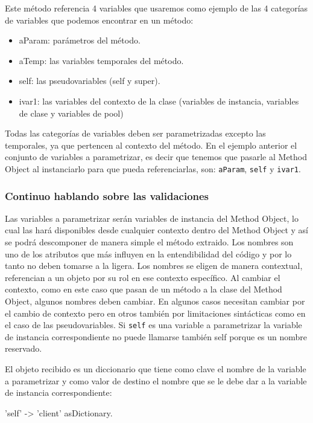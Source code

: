 Este método referencia 4 variables que usaremos como ejemplo de las 4 categorías
de variables que podemos encontrar en un método:

\begin{itemize}
    \item aParam: parámetros del método.
    \item aTemp: las variables temporales del método.
    \item self: las pseudovariables (self y super).
    \item ivar1: las variables del contexto de la clase (variables de instancia,
      variables de clase y variables de pool)
\end{itemize}

Todas las categorías de variables deben ser parametrizadas excepto las
temporales, ya que pertencen al contexto del método. En el ejemplo anterior el
conjunto de variables a parametrizar, es decir que tenemos que pasarle al Method
Object al instanciarlo para que pueda referenciarlas, son: \lstinline{aParam},
\lstinline{self} y \lstinline{ivar1}.

\subsubsection{Continuo hablando sobre las validaciones}

Las variables a parametrizar serán variables de instancia del Method Object, lo
cual las hará disponibles desde cualquier contexto dentro del Method Object y
así se podrá descomponer de manera simple el método extraido. Los nombres son
uno de los atributos que más influyen en la entendibilidad del código y por lo
tanto no deben tomarse a la ligera. Los nombres se eligen de manera contextual,
referencian a un objeto por su rol en ese contexto específico. Al cambiar el
contexto, como en este caso que pasan de un método a la clase del Method Object,
algunos nombres deben cambiar. En algunos casos necesitan cambiar por el cambio
de contexto pero en otros también por limitaciones sintácticas como en el caso
de las pseudovariables. Si \lstinline{self} es una variable a parametrizar la
variable de instancia correspondiente no puede llamarse también self porque es
un nombre reservado.

El objeto recibido es un diccionario que tiene como clave el nombre de la
variable a parametrizar y como valor de destino el nombre que se le debe dar a
la variable de instancia correspondiente:

\begin{code}
    { 'self' -> 'client' } asDictionary.
\end{code}

